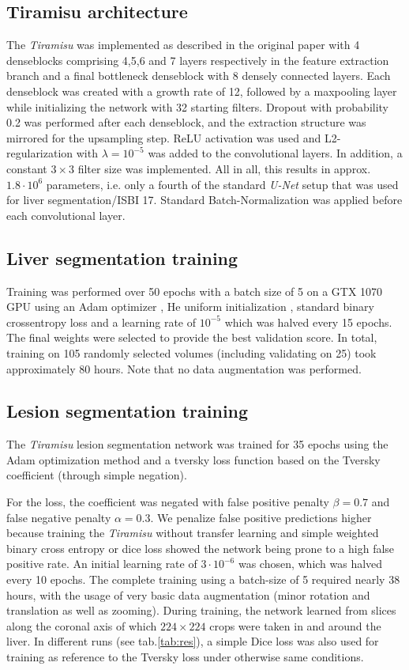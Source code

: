 \documentclass{article}
\begin{document}
\subsection{Tiramisu architecture}
The \textit{Tiramisu} was implemented as described in the original paper with 4 denseblocks comprising 4,5,6 and 7 layers respectively in the feature extraction branch and a final bottleneck denseblock with 8 densely connected layers. Each denseblock was created with a growth rate of 12, followed by a maxpooling layer while initializing the network with 32 starting filters. Dropout with probability 0.2 was performed after each denseblock, and the extraction structure was mirrored for the upsampling step. ReLU activation was used and L2-regularization with $\lambda=10^{-5}$ was added to the convolutional layers. In addition, a constant $3\times 3$ filter size was implemented. All in all, this results in approx. $1.8\cdot 10^6$ parameters, i.e. only a fourth of the standard \textit{U-Net} setup that was used for liver segmentation/ISBI 17. Standard Batch-Normalization was applied before each convolutional layer.


\subsection{Liver segmentation training}
Training was performed over 50 epochs with a batch size of 5 on a GTX 1070 GPU using an Adam optimizer \cite{ADAM}, He uniform initialization \cite{heinit}, standard binary crossentropy loss and a learning rate of $10^{-5}$ which was halved every 15 epochs. The final weights were selected to provide the best validation score. In total, training on 105 randomly selected volumes (including validating on 25) took approximately 80 hours. Note that no data augmentation was performed.


\subsection{Lesion segmentation training}
The \textit{Tiramisu} lesion segmentation network was trained for 35 epochs using the Adam optimization method and a tversky loss function \cite{tversky} based on the Tversky coefficient (through simple negation).

For the loss, the coefficient was negated with false positive penalty  $\beta = 0.7$ and false negative penalty $\alpha=0.3$. We penalize false positive predictions higher because training the \textit{Tiramisu} without transfer learning and simple weighted binary cross entropy or dice loss showed the network being prone to a high false positive rate. An initial learning rate of $3\cdot 10^{-6}$ was chosen, which was halved every 10 epochs. The complete training using a batch-size of 5 required nearly 38 hours, with the usage of very basic data augmentation (minor rotation and translation as well as zooming).
During training, the network learned from slices along the coronal axis of which $224\times 224$ crops were taken in and around the liver. In different runs (see tab.\ref{tab:res}), a simple Dice loss was also used for training as reference to the Tversky loss under otherwise same conditions.
\end{document}
